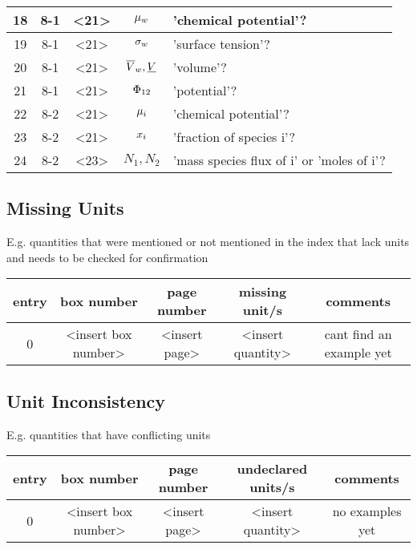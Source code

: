 \begin{longtable} { | c | c | c | c | p{6cm} | }
    18 & 8-1 & <21> & $\chempot_{w}$ & 'chemical potential'? \\ \hline
    19 & 8-1 & <21> & $\surftens_{w}$ & 'surface tension'? \\ \hline
    20 & 8-1 & <21> & $\overline{\vol}_{w}, \uline{\vol}$ & 'volume'? \\ \hline
    21 & 8-1 & <21> & $\pot_{12}$ & 'potential'? \\ \hline
    22 & 8-2 & <21> & $\chempot_{i}$ & 'chemical potential'? \\ \hline
    23 & 8-2 & <21> & $\specfrac{i}$ & 'fraction of species i'? \\ \hline
 	24 & 8-2 & <23> & $N_{1}, N_{2}$ & 'mass species flux of i' or 'moles of i'? \\ \hline

\end{longtable}

\subsection{Missing Units}

E.g. quantities that were mentioned or not mentioned in the index that lack units and needs to be checked for confirmation \\

\begin{longtable} { | c | c | c | c | c | }
 \hline
 	entry & box number & page number
    & missing unit/s 
    & comments\\
     \hline
	0 & <insert box number> & <insert page> & <insert quantity> & cant find an example yet \\ \hline

\end{longtable}

\subsection{Unit Inconsistency}

E.g. quantities that have conflicting units \\ 

\begin{longtable} { | c | c | c | c | c | } 
 \hline
    entry & box number & page number
    & undeclared units/s 
    & comments \\
 \hline
	0 & <insert box number> & <insert page> & <insert quantity> & no examples yet \\ \hline


\end{longtable}

